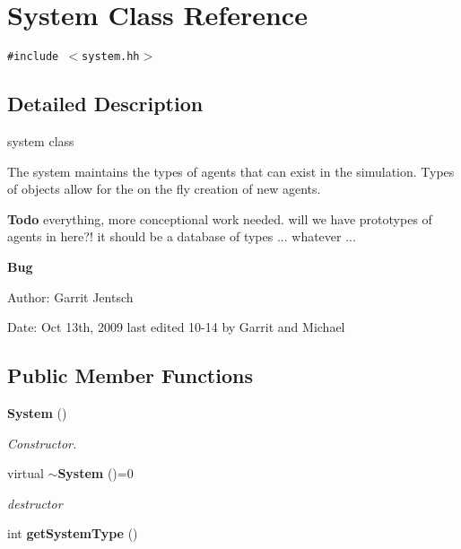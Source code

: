 \section{System Class Reference}
\label{classSystem}
{\tt \#include $<$system.hh$>$}



\subsection{Detailed Description}
system class 

The system maintains the types of agents that can exist in the simulation. Types of objects allow for the on the fly creation of new agents.

\begin{Desc}
\item[{\bf Todo}]everything, more conceptional work needed. will we have prototypes of agents in here?! it should be a database of types ... whatever ...\end{Desc}
\begin{Desc}
\item[{\bf Bug}]\end{Desc}
\begin{Desc}
\item[Author:]Garrit Jentsch\end{Desc}
\begin{Desc}
\item[Date:]Oct 13th, 2009 last edited 10-14 by Garrit and Michael \end{Desc}
\subsection*{Public Member Functions}
\begin{CompactItemize}
\item 
{\bf System} ()
\begin{CompactList}\small\item\em Constructor. \item\end{CompactList}\item 
virtual {\bf $\sim$System} ()=0
\begin{CompactList}\small\item\em destructor \item\end{CompactList}\item 
int {\bf getSystemType} ()
\end{CompactItemize}
